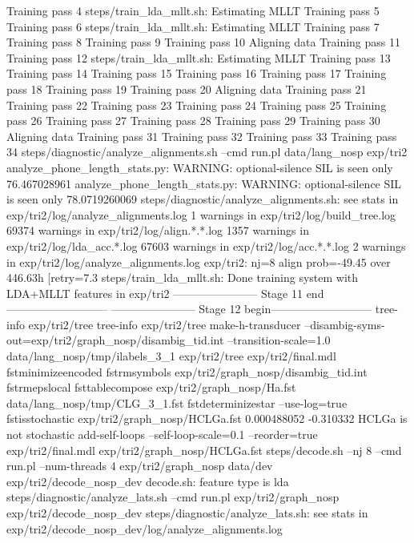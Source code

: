 Training pass 4
steps/train_lda_mllt.sh: Estimating MLLT
Training pass 5
Training pass 6
steps/train_lda_mllt.sh: Estimating MLLT
Training pass 7
Training pass 8
Training pass 9
Training pass 10
Aligning data
Training pass 11
Training pass 12
steps/train_lda_mllt.sh: Estimating MLLT
Training pass 13
Training pass 14
Training pass 15
Training pass 16
Training pass 17
Training pass 18
Training pass 19
Training pass 20
Aligning data
Training pass 21
Training pass 22
Training pass 23
Training pass 24
Training pass 25
Training pass 26
Training pass 27
Training pass 28
Training pass 29
Training pass 30
Aligning data
Training pass 31
Training pass 32
Training pass 33
Training pass 34
steps/diagnostic/analyze_alignments.sh --cmd run.pl data/lang_nosp exp/tri2
analyze_phone_length_stats.py: WARNING: optional-silence SIL is seen only 76.467028961%
analyze_phone_length_stats.py: WARNING: optional-silence SIL is seen only 78.0719260069%
steps/diagnostic/analyze_alignments.sh: see stats in exp/tri2/log/analyze_alignments.log
1 warnings in exp/tri2/log/build_tree.log
69374 warnings in exp/tri2/log/align.*.*.log
1357 warnings in exp/tri2/log/lda_acc.*.log
67603 warnings in exp/tri2/log/acc.*.*.log
2 warnings in exp/tri2/log/analyze_alignments.log
exp/tri2: nj=8 align prob=-49.45 over 446.63h [retry=7.3%
steps/train_lda_mllt.sh: Done training system with LDA+MLLT features in exp/tri2
----------------------- Stage 11 end---------------------------
----------------------- Stage 12 begin---------------------------
tree-info exp/tri2/tree 
tree-info exp/tri2/tree 
make-h-transducer --disambig-syms-out=exp/tri2/graph_nosp/disambig_tid.int --transition-scale=1.0 data/lang_nosp/tmp/ilabels_3_1 exp/tri2/tree exp/tri2/final.mdl 
fstminimizeencoded 
fstrmsymbols exp/tri2/graph_nosp/disambig_tid.int 
fstrmepslocal 
fsttablecompose exp/tri2/graph_nosp/Ha.fst data/lang_nosp/tmp/CLG_3_1.fst 
fstdeterminizestar --use-log=true 
fstisstochastic exp/tri2/graph_nosp/HCLGa.fst 
0.000488052 -0.310332
HCLGa is not stochastic
add-self-loops --self-loop-scale=0.1 --reorder=true exp/tri2/final.mdl exp/tri2/graph_nosp/HCLGa.fst 
steps/decode.sh --nj 8 --cmd run.pl --num-threads 4 exp/tri2/graph_nosp data/dev exp/tri2/decode_nosp_dev
decode.sh: feature type is lda
steps/diagnostic/analyze_lats.sh --cmd run.pl exp/tri2/graph_nosp exp/tri2/decode_nosp_dev
steps/diagnostic/analyze_lats.sh: see stats in exp/tri2/decode_nosp_dev/log/analyze_alignments.log
